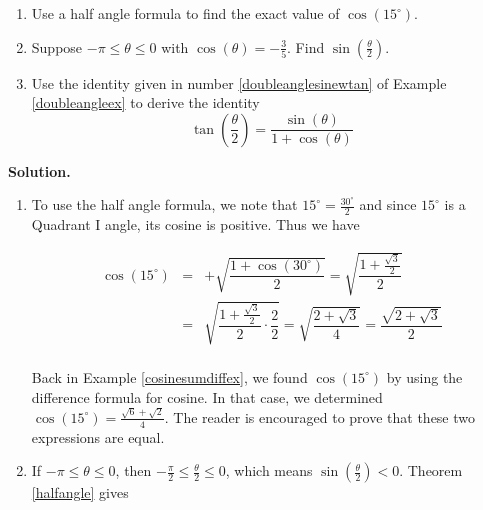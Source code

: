 \begin{ex} $~$

\begin{enumerate}

\item  Use a half angle formula to find the exact value of $\cos\left(15^{\circ}\right)$.

\item  Suppose $-\pi \leq \theta \leq 0$ with $\cos(\theta) = -\frac{3}{5}$.  Find $\sin\left(\frac{\theta}{2}\right)$.

\item  Use the identity given in number \ref{doubleanglesinewtan} of Example \ref{doubleangleex} to derive the identity \[\tan\left(\dfrac{\theta}{2}\right) = \dfrac{\sin(\theta)}{1+\cos(\theta)}\]

\end{enumerate}

{\bf Solution.}

\begin{enumerate}

\item  To use the half angle formula, we note that $15^{\circ} = \frac{30^{\circ}}{2}$ and since $15^{\circ}$ is a Quadrant I angle, its cosine is positive.  Thus we have

\vspace{-.1in}

\[ \begin{array}{rcl}

\cos\left(15^{\circ}\right) & = &  + \sqrt{\dfrac{1+\cos\left(30^{\circ}\right)}{2}} = \sqrt{\dfrac{1+\frac{\sqrt{3}}{2}}{2}}\\ [10pt] 
                          	& = & \sqrt{\dfrac{1+\frac{\sqrt{3}}{2}}{2}\cdot \dfrac{2}{2}} = \sqrt{\dfrac{2+\sqrt{3}}{4}} = \dfrac{\sqrt{2+\sqrt{3}}}{2}\\
\end{array}\]

Back in Example \ref{cosinesumdiffex}, we found $\cos\left(15^{\circ}\right)$ by using the difference formula for cosine.  In that case, we determined $\cos\left(15^{\circ}\right) = \frac{\sqrt{6}+ \sqrt{2}}{4}$.  The reader is encouraged to prove that these two expressions are equal.

\item  If $-\pi \leq \theta \leq 0$, then $-\frac{\pi}{2} \leq \frac{\theta}{2} \leq 0$, which means $\sin\left(\frac{\theta}{2}\right) < 0$.  Theorem \ref{halfangle} gives

\vspace{-.1in}


\end{enumerate}
\end{ex}
